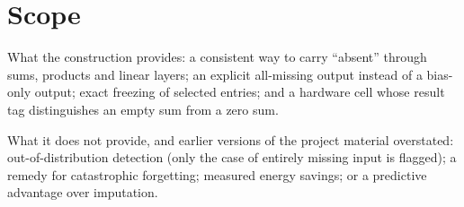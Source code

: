 \documentclass[11pt,a4paper]{article}
\theoremstyle{definition}
\theoremstyle{remark}
\begin{document}
\section{Scope}

What the construction provides: a consistent way to carry ``absent'' through
sums, products and linear layers; an explicit all-missing output instead of a
bias-only output; exact freezing of selected entries; and a hardware cell
whose result tag distinguishes an empty sum from a zero sum.

What it does not provide, and earlier versions of the project material
overstated: out-of-distribution detection (only the case of entirely missing
input is flagged); a remedy for catastrophic forgetting; measured energy
savings; or a predictive advantage over imputation.
\end{document}
